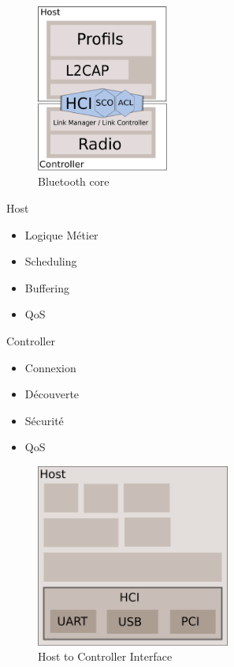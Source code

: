 \begin{frame}

\begin{minipage}[t]{0.45\linewidth}

\begin{figure}
\vspace{0.5cm}
\includegraphics[height=5.5cm]{arch_core.png}
\caption{Bluetooth core}
\end{figure}

\end{minipage}
\begin{minipage}[t]{0.52\linewidth}
\begin{block}{Host}
\begin{itemize}
	\item Logique Métier
	\item Scheduling
	\item Buffering
	\item QoS
\end{itemize}
\end{block}

\begin{block}{Controller}
\begin{itemize}
	\item Connexion
	\item Découverte
	\item Sécurité
	\item QoS
\end{itemize}
\end{block}


\end{minipage}
\end{frame}

\begin{frame}
	\begin{figure}
		\includegraphics[height=6cm]{arch_log_hci.png}
		\caption{Host to Controller Interface}
	\end{figure}
\end{frame}

